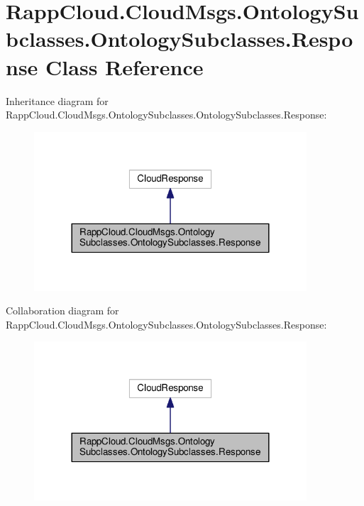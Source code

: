 \hypertarget{classRappCloud_1_1CloudMsgs_1_1OntologySubclasses_1_1OntologySubclasses_1_1Response}{\section{Rapp\-Cloud.\-Cloud\-Msgs.\-Ontology\-Subclasses.\-Ontology\-Subclasses.\-Response Class Reference}
\label{classRappCloud_1_1CloudMsgs_1_1OntologySubclasses_1_1OntologySubclasses_1_1Response}
}


Inheritance diagram for Rapp\-Cloud.\-Cloud\-Msgs.\-Ontology\-Subclasses.\-Ontology\-Subclasses.\-Response\-:
\nopagebreak
\begin{figure}[H]
\begin{center}
\leavevmode
\includegraphics[width=288pt]{classRappCloud_1_1CloudMsgs_1_1OntologySubclasses_1_1OntologySubclasses_1_1Response__inherit__graph}
\end{center}
\end{figure}


Collaboration diagram for Rapp\-Cloud.\-Cloud\-Msgs.\-Ontology\-Subclasses.\-Ontology\-Subclasses.\-Response\-:
\nopagebreak
\begin{figure}[H]
\begin{center}
\leavevmode
\includegraphics[width=288pt]{classRappCloud_1_1CloudMsgs_1_1OntologySubclasses_1_1OntologySubclasses_1_1Response__coll__graph}
\end{center}
\end{figure}
